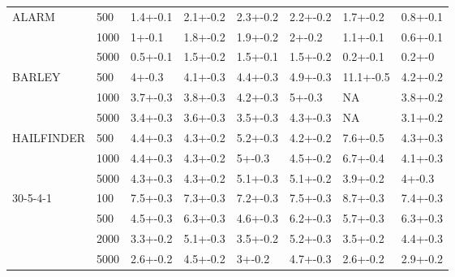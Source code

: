 \documentclass{svmult}
\begin{document}
\begin{table}[]
\begin{tabular}{llllllll}
ALARM      & 500     & 1.4+-0.1      & 2.1+-0.2     & 2.3+-0.2  & 2.2+-0.2 & 1.7+-0.2 & \cellcolor{lightgray}0.8+-0.1 \\
           & 1000    & 1+-0.1        & 1.8+-0.2     & 1.9+-0.2  & 2+-0.2   & 1.1+-0.1 & \cellcolor{lightgray}0.6+-0.1 \\
           & 5000    & 0.5+-0.1      & 1.5+-0.2     & 1.5+-0.1  & 1.5+-0.2 & \cellcolor{lightgray}0.2+-0.1 & \cellcolor{lightgray}0.2+-0   \\ \hline
BARLEY     & 500     & \cellcolor{lightgray}4+-0.3        & \cellcolor{lightgray}4.1+-0.3     & \cellcolor{lightgray}4.4+-0.3  & 4.9+-0.3 & 11.1+-0.5 & \cellcolor{lightgray}4.2+-0.2 \\
           & 1000    & \cellcolor{lightgray}3.7+-0.3      & \cellcolor{lightgray}3.8+-0.3     & \cellcolor{lightgray}4.2+-0.3  & 5+-0.3 & NA & \cellcolor{lightgray}3.8+-0.2 \\
           & 5000    & \cellcolor{lightgray}3.4+-0.3      & \cellcolor{lightgray}3.6+-0.3     & \cellcolor{lightgray}3.5+-0.3  & 4.3+-0.3 & NA & \cellcolor{lightgray}3.1+-0.2 \\ \hline
HAILFINDER & 500     & \cellcolor{lightgray}4.4+-0.3      & \cellcolor{lightgray}4.3+-0.2      & 5.2+-0.3  & \cellcolor{lightgray}4.2+-0.2 & 7.6+-0.5 & \cellcolor{lightgray}4.3+-0.3 \\
           & 1000    & \cellcolor{lightgray}4.4+-0.3      & \cellcolor{lightgray}4.3+-0.2     & 5+-0.3    & \cellcolor{lightgray}4.5+-0.2 & 6.7+-0.4 & \cellcolor{lightgray}4.1+-0.3 \\
           & 5000    & \cellcolor{lightgray}4.3+-0.3      & \cellcolor{lightgray}4.3+-0.2       & 5.1+-0.3  & 5.1+-0.2 & \cellcolor{lightgray}3.9+-0.2 & \cellcolor{lightgray}4+-0.3  \\ \hline
30-5-4-1   & 100     & \cellcolor{lightgray}7.5+-0.3      & \cellcolor{lightgray}7.3+-0.3     & \cellcolor{lightgray}7.2+-0.3  & \cellcolor{lightgray}7.5+-0.3 & 8.7+-0.3 & \cellcolor{lightgray}7.4+-0.3 \\
		   & 500     & \cellcolor{lightgray}4.5+-0.3      & 6.3+-0.3     & \cellcolor{lightgray}4.6+-0.3  & 6.2+-0.3 & 5.7+-0.3 & 6.3+-0.3 \\
           & 2000    & \cellcolor{lightgray}3.3+-0.2      & 5.1+-0.3     & \cellcolor{lightgray}3.5+-0.2  & 5.2+-0.3 & \cellcolor{lightgray}3.5+-0.2 & 4.4+-0.3 \\
           & 5000    & \cellcolor{lightgray}2.6+-0.2      & 4.5+-0.2     & \cellcolor{lightgray}3+-0.2    & 4.7+-0.3 & \cellcolor{lightgray}2.6+-0.2 & \cellcolor{lightgray}2.9+-0.2 \\ \hline

\end{tabular}
\end{table}
\end{document}
